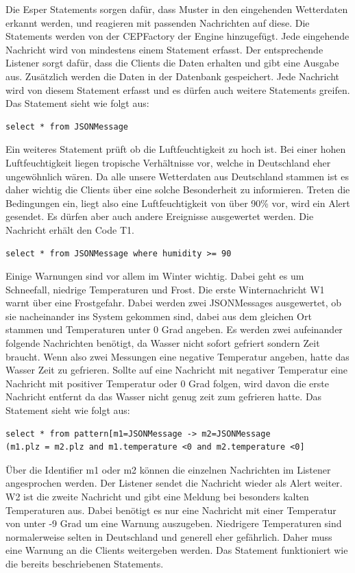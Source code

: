 Die Esper Statements sorgen dafür, dass Muster in den eingehenden Wetterdaten erkannt werden, und reagieren mit passenden Nachrichten auf diese. Die Statements werden von der CEPFactory der Engine hinzugefügt. Jede eingehende Nachricht wird von mindestens einem Statement erfasst. Der entsprechende Listener sorgt dafür, dass die Clients die Daten erhalten und gibt eine Ausgabe aus. Zusätzlich werden die Daten in der Datenbank gespeichert. Jede Nachricht wird von diesem Statement erfasst und es dürfen auch weitere Statements greifen. Das Statement sieht wie folgt aus: 
\begin{lstlisting}
select * from JSONMessage
\end{lstlisting}
Ein weiteres Statement prüft ob die Luftfeuchtigkeit zu hoch ist. Bei einer hohen Luftfeuchtigkeit liegen tropische Verhältnisse vor, welche in Deutschland eher ungewöhnlich wären. Da alle unsere Wetterdaten aus Deutschland stammen ist es daher wichtig die Clients über eine solche Besonderheit zu informieren. Treten die Bedingungen ein, liegt also eine Luftfeuchtigkeit von über 90\% vor, wird ein Alert gesendet. Es dürfen aber auch andere Ereignisse ausgewertet werden.  Die Nachricht erhält den Code T1. 
\begin{lstlisting}
select * from JSONMessage where humidity >= 90
\end{lstlisting}
Einige Warnungen sind vor allem im Winter wichtig. Dabei geht es um Schneefall, niedrige Temperaturen und Frost. Die erste Winternachricht W1 warnt über eine Frostgefahr. Dabei werden zwei JSONMessages ausgewertet, ob sie nacheinander ins System gekommen sind, dabei aus dem gleichen Ort stammen und Temperaturen unter 0 Grad angeben. Es werden zwei aufeinander folgende Nachrichten benötigt, da Wasser nicht sofort gefriert sondern Zeit braucht. Wenn also zwei Messungen eine negative Temperatur angeben, hatte das Wasser Zeit zu gefrieren. Sollte auf eine Nachricht mit negativer Temperatur eine Nachricht mit positiver Temperatur oder 0 Grad folgen, wird davon die erste Nachricht entfernt da das Wasser nicht genug zeit zum gefrieren hatte. Das Statement sieht wie folgt aus: 
\begin{lstlisting}
select * from pattern[m1=JSONMessage -> m2=JSONMessage 
(m1.plz = m2.plz and m1.temperature <0 and m2.temperature <0]
\end{lstlisting}
Über die Identifier m1 oder m2 können die einzelnen Nachrichten im Listener angesprochen werden. Der Listener sendet die Nachricht wieder als Alert weiter. W2 ist die zweite Nachricht und gibt eine Meldung bei besonders kalten Temperaturen aus. Dabei benötigt es nur eine Nachricht mit einer Temperatur von unter -9 Grad um eine Warnung auszugeben. Niedrigere Temperaturen sind normalerweise selten in Deutschland und generell eher gefährlich. Daher muss eine Warnung an die Clients weitergeben werden. Das Statement funktioniert wie die bereits beschriebenen Statements. 
